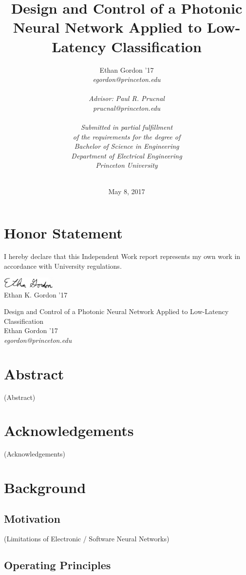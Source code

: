 \documentclass[12pt]{article}
\title{Design and Control of a Photonic Neural Network Applied to Low-Latency Classification}
\author{Ethan Gordon '17 \\ \em{egordon@princeton.edu} \\ \\ Advisor: Paul R. Prucnal \\ \em{prucnal@princeton.edu} \\ \\ Submitted in partial fulfillment \\ of the requirements for the degree of \\ Bachelor of Science in Engineering \\ Department of Electrical Engineering \\ Princeton University \\ \\}
\date{May 8, 2017}
\begin{document}
\maketitle

\newpage

\section*{Honor Statement}
I hereby declare that this Independent Work report represents my own work in accordance with University regulations.
\begin{flushright}
\includegraphics[width=0.2\textwidth]{Signature} \\
Ethan K. Gordon '17
\end{flushright}

\newpage
\begin{centering}
{\LARGE Design and Control of a Photonic Neural Network Applied to Low-Latency Classification} \\
\vspace*{10px}
{\large Ethan Gordon '17} \\
{\em egordon@princeton.edu} \\
\end{centering}

\section*{Abstract}
(Abstract)
\newpage

\section*{Acknowledgements}
(Acknowledgements) \\

\tableofcontents

\newpage

\section{Background}
\subsection{Motivation}
(Limitations of Electronic / Software Neural Networks)

\subsection{Operating Principles}
\end{document}
